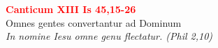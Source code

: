 


\def\greinitialformat#1{%
{\fontsize{39}{39}\selectfont #1}%
}




\vspace{0.3cm}
\begin{center}
 \textcolor{red}{\large \bf Canticum XIII Is 45,15-26}\\
Omnes gentes convertantur ad Dominum\\
\textit{\small In nomine Iesu omne genu flectatur. (Phil 2,10)}
\end{center}
